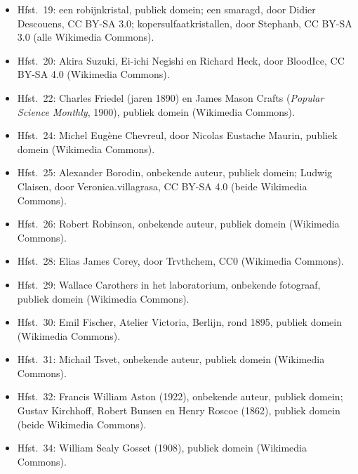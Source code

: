 \begin{itemize}
        Werner, Les Prix Nobel (1914), publiek domein (beide Wikimedia Commons).
  \item Hfst.~19: een robijnkristal, publiek domein; een smaragd, door Didier Descouens,
        CC BY-SA 3.0; kopersulfaatkristallen, door Stephanb, CC BY-SA 3.0 (alle
        Wikimedia Commons).
  \item Hfst.~20: Akira Suzuki, Ei-ichi Negishi en Richard Heck, door BloodIce, CC BY-SA
        4.0 (Wikimedia Commons).
  \item Hfst.~22: Charles Friedel (jaren 1890) en James Mason Crafts (\textit{Popular
        Science Monthly}, 1900), publiek domein (Wikimedia Commons).
  \item Hfst.~24: Michel Eugène Chevreul, door Nicolas Eustache Maurin, publiek domein
        (Wikimedia Commons).
  \item Hfst.~25: Alexander Borodin, onbekende auteur, publiek domein; Ludwig Claisen, door
        Veronica.villagrasa, CC BY-SA 4.0 (beide Wikimedia Commons).
  \item Hfst.~26: Robert Robinson, onbekende auteur, publiek domein (Wikimedia Commons).
  \item Hfst.~28: Elias James Corey, door Trvthchem, CC0 (Wikimedia Commons).
  \item Hfst.~29: Wallace Carothers in het laboratorium, onbekende fotograaf, publiek domein
        (Wikimedia Commons).
  \item Hfst.~30: Emil Fischer, Atelier Victoria, Berlijn, rond 1895, publiek domein (Wikimedia
        Commons).
  \item Hfst.~31: Michail Tsvet, onbekende auteur, publiek domein (Wikimedia Commons).
  \item Hfst.~32: Francis William Aston (1922), onbekende auteur, publiek domein; Gustav Kirchhoff,
        Robert Bunsen en Henry Roscoe (1862), publiek domein (beide Wikimedia Commons).
  \item Hfst.~34: William Sealy Gosset (1908), publiek domein (Wikimedia Commons).
\end{itemize}
\clearpage
